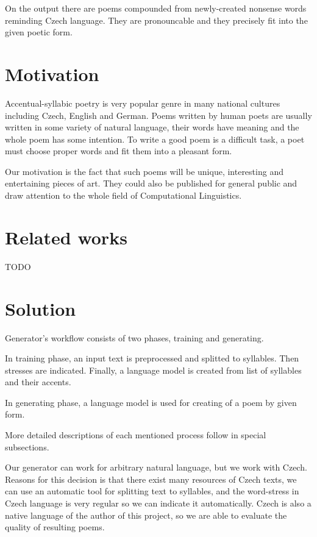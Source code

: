\documentclass[a4]{article}
\begin{document}
On the output there are poems compounded from newly-created nonsense words
reminding Czech language. They are pronouncable and they precisely
fit into the given poetic form.

\section{Motivation}

Accentual-syllabic poetry is very popular genre in many national cultures
including Czech, English and German. Poems written by human
poets are usually written in some variety of natural language, their words
have meaning and the whole poem has some intention.
To write a good poem is a difficult task, a poet must choose proper words
and fit them into a pleasant form. 

Our motivation is the fact that such poems will be unique, interesting and
entertaining pieces of art. They could also be published for
general public and draw attention to the whole field of Computational Linguistics.

\section{Related works}

TODO

\section{Solution}

Generator's workflow consists of two phases, training and generating. 

In
training phase, an input text is preprocessed and splitted to syllables.
Then stresses are indicated.  Finally, a language model is created from list
of syllables and their accents.

In generating phase, a language model is used for creating of a poem by given form.

More detailed descriptions of each mentioned process follow in special subsections.

Our generator can work for arbitrary natural language, but we work with
Czech. Reasons for this decision is that there exist many
resources of Czech texts, we can use an automatic tool for splitting text to syllables,
and the word-stress in Czech language is very regular so we can indicate
it automatically. Czech is also a native language of the author of this
project, so we are able to evaluate the quality of resulting poems. 
\end{document}
